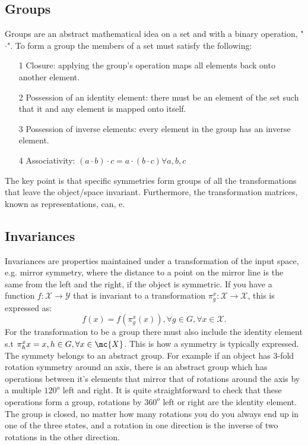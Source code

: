 \subsection{Groups}
Groups are an abstract mathematical idea on a set and with a binary operation, "$\cdot$". To form a group the members of a set must satisfy the following:
\begin{itemize}
	\item[1] Closure: applying the group's operation maps all elements back onto another element.
	\item[2] Possession of an identity element: there must be an element of the set such that it and any element is mapped onto itself.
	\item[3] Possession of inverse elements: every element in the group has an inverse element.
	\item [4] Associativity: $(a \cdot b) \cdot c = a \cdot (b \cdot c) \forall a, b, c$
\end{itemize}
The key point is that specific symmetries form groups of all the transformations that leave the object/space invariant. Furthermore, the transformation matrices, known as representations, can, e.

\subsection{Invariances}
Invariances are properties maintained under a transformation of the input space, e.g. mirror symmetry, where the distance to a point on the mirror line is the same from the left and the right, if the object is symmetric. If you have a function $f: \mathcal{X} \rightarrow \mathcal{Y}$ that is invariant to a transformation $\pi_g^x: \mathcal{X} \rightarrow \mathcal{X}$, this is expressed as:
\begin{equation}
	f(x) = f(\pi_g^x (x)),   \forall g \in G, \forall x \in \mathcal{X}.
\end{equation}
For the transformation to be a group there must also include the identity element s.t $\pi_h^xx = x,  h \in G, \forall x\in \mc{X}$. This is how a symmetry is typically expressed. The symmety belongs to an abstract group. For example if an object has 3-fold rotation symmetry around an axis, there is an abstract group which has operations between it's elements that mirror that of rotations around the axis by a multiple $120^o$ left and right. It is quite straightforward to check that these operations form a group, rotations by $360^o$ left or right are the identity element. The group is closed, no matter how many rotations you do you always end up in one of the three states, and a rotation in one direction is the inverse of two rotations in the other direction.

